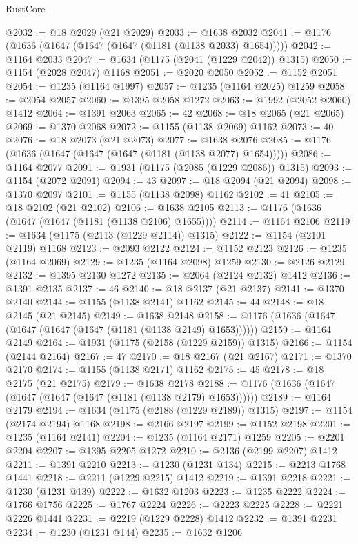 \begin{lexlean}{RustCore}
\begin{coremodule}
@2032 := @18 @2029 (@21 @2029)
@2033 := @1638 @2032
@2041 := @1176 (@1636 (@1647 (@1647 (@1647 (@1181 (@1138 @2033) @1654)))))
@2042 := @1164 @2033
@2047 := @1634 (@1175 (@2041 (@1229 @2042)) @1315)
@2050 := @1154 (@2028 @2047) @1168
@2051 := @2020 @2050
@2052 := @1152 @2051
@2054 := @1235 (@1164 @1997)
@2057 := @1235 (@1164 @2025) @1259
@2058 := @2054 @2057
@2060 := @1395 @2058 @1272
@2063 := @1992 (@2052 @2060) @1412
@2064 := @1391 @2063
@2065 := 42
@2068 := @18 @2065 (@21 @2065)
@2069 := @1370 @2068
@2072 := @1155 (@1138 @2069) @1162
@2073 := 40
@2076 := @18 @2073 (@21 @2073)
@2077 := @1638 @2076
@2085 := @1176 (@1636 (@1647 (@1647 (@1647 (@1181 (@1138 @2077) @1654)))))
@2086 := @1164 @2077
@2091 := @1931 (@1175 (@2085 (@1229 @2086)) @1315)
@2093 := @1154 (@2072 @2091)
@2094 := 43
@2097 := @18 @2094 (@21 @2094)
@2098 := @1370 @2097
@2101 := @1155 (@1138 @2098) @1162
@2102 := 41
@2105 := @18 @2102 (@21 @2102)
@2106 := @1638 @2105
@2113 := @1176 (@1636 (@1647 (@1647 (@1181 (@1138 @2106) @1655))))
@2114 := @1164 @2106
@2119 := @1634 (@1175 (@2113 (@1229 @2114)) @1315)
@2122 := @1154 (@2101 @2119) @1168
@2123 := @2093 @2122
@2124 := @1152 @2123
@2126 := @1235 (@1164 @2069)
@2129 := @1235 (@1164 @2098) @1259
@2130 := @2126 @2129
@2132 := @1395 @2130 @1272
@2135 := @2064 (@2124 @2132) @1412
@2136 := @1391 @2135
@2137 := 46
@2140 := @18 @2137 (@21 @2137)
@2141 := @1370 @2140
@2144 := @1155 (@1138 @2141) @1162
@2145 := 44
@2148 := @18 @2145 (@21 @2145)
@2149 := @1638 @2148
@2158 := @1176 (@1636 (@1647 (@1647 (@1647 (@1647 (@1181 (@1138 @2149) @1653))))))
@2159 := @1164 @2149
@2164 := @1931 (@1175 (@2158 (@1229 @2159)) @1315)
@2166 := @1154 (@2144 @2164)
@2167 := 47
@2170 := @18 @2167 (@21 @2167)
@2171 := @1370 @2170
@2174 := @1155 (@1138 @2171) @1162
@2175 := 45
@2178 := @18 @2175 (@21 @2175)
@2179 := @1638 @2178
@2188 := @1176 (@1636 (@1647 (@1647 (@1647 (@1647 (@1181 (@1138 @2179) @1653))))))
@2189 := @1164 @2179
@2194 := @1634 (@1175 (@2188 (@1229 @2189)) @1315)
@2197 := @1154 (@2174 @2194) @1168
@2198 := @2166 @2197
@2199 := @1152 @2198
@2201 := @1235 (@1164 @2141)
@2204 := @1235 (@1164 @2171) @1259
@2205 := @2201 @2204
@2207 := @1395 @2205 @1272
@2210 := @2136 (@2199 @2207) @1412
@2211 := @1391 @2210
@2213 := @1230 (@1231 @134)
@2215 := @2213 @1768 @1441
@2218 := @2211 (@1229 @2215) @1412
@2219 := @1391 @2218
@2221 := @1230 (@1231 @139)
@2222 := @1632 @1203
@2223 := @1235 @2222
@2224 := @1766 @1756
@2225 := @1767 @2224
@2226 := @2223 @2225
@2228 := @2221 @2226 @1441
@2231 := @2219 (@1229 @2228) @1412
@2232 := @1391 @2231
@2234 := @1230 (@1231 @144)
@2235 := @1632 @1206

\end{coremodule}
\end{lexlean}
